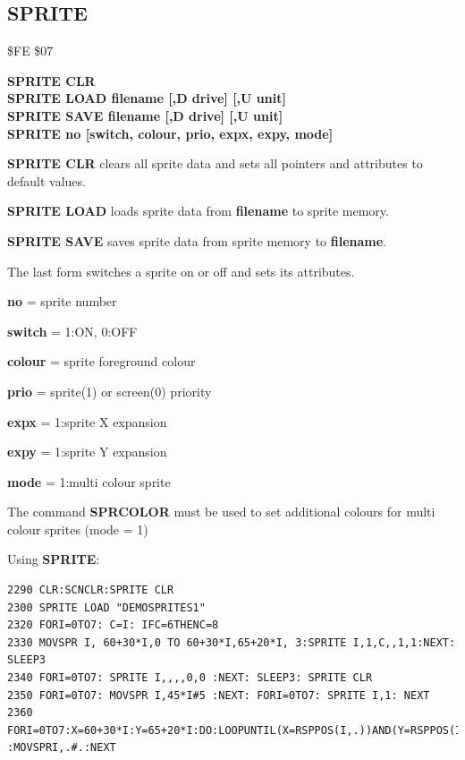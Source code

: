 \subsection{SPRITE}
\begin{description}[leftmargin=2cm,style=nextline]
\item [Token:] \$FE \$07
\item [Format:] {\bf SPRITE CLR} \\
                {\bf SPRITE LOAD filename [,D drive] [,U unit]} \\
                {\bf SPRITE SAVE filename [,D drive] [,U unit]} \\
                {\bf SPRITE no [switch, colour, prio, expx, expy, mode]}
\item [Usage:]  {\bf SPRITE CLR} clears all sprite data and sets all pointers
                and attributes to default values.

                {\bf SPRITE LOAD } loads sprite data from {\bf filename}
                to sprite memory.

                {\bf SPRITE SAVE } saves sprite data from
                sprite memory to {\bf filename}.

                \filenamedefinition

                The last form switches a sprite on or off and sets its attributes.

                {\bf no} = sprite number

                {\bf switch} = 1:ON, 0:OFF

                {\bf colour} = sprite foreground colour

                {\bf prio} = sprite(1) or screen(0) priority

                {\bf expx} = 1:sprite X expansion

                {\bf expy} = 1:sprite Y expansion

                {\bf mode} = 1:multi colour sprite

\item [Remarks:] The command {\bf SPRCOLOR} must be used to set
                additional colours
                for multi colour sprites (mode = 1)

\item [Example:] Using {\bf SPRITE}:
\begin{tcolorbox}[colback=black,coltext=white]
\verbatimfont{\codefont}
\begin{verbatim}
2290 CLR:SCNCLR:SPRITE CLR
2300 SPRITE LOAD "DEMOSPRITES1"
2320 FORI=0TO7: C=I: IFC=6THENC=8
2330 MOVSPR I, 60+30*I,0 TO 60+30*I,65+20*I, 3:SPRITE I,1,C,,1,1:NEXT: SLEEP3
2340 FORI=0TO7: SPRITE I,,,,0,0 :NEXT: SLEEP3: SPRITE CLR
2350 FORI=0TO7: MOVSPR I,45*I#5 :NEXT: FORI=0TO7: SPRITE I,1: NEXT
2360 FORI=0TO7:X=60+30*I:Y=65+20*I:DO:LOOPUNTIL(X=RSPPOS(I,.))AND(Y=RSPPOS(I,1))
:MOVSPRI,.#.:NEXT
\end{verbatim}
\end{tcolorbox}
\end{description}

